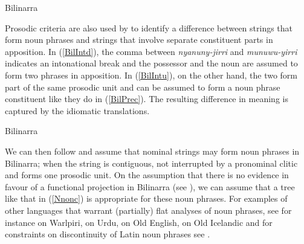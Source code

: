 \documentclass[output=paper,hidelinks]{langscibook}
\begin{document}
\eal\label{Biyi} Bilinarra
\zl

Prosodic criteria are also used by \citeauthor{MeakNord14} to identify a difference between strings that form noun phrases and strings that involve separate constituent parts in apposition. In (\ref{BilIntd}), the comma between \emph{nyanuny-jirri} and  \emph{munuwu-yirri} indicates an intonational break and the possessor and the noun are assumed to form two phrases in apposition. In (\ref{BilIntu}), on the other hand, the two form part of the same prosodic unit and can be assumed to form a noun phrase constituent like they do in (\ref{BilPrec}). The resulting difference in meaning is captured by the idiomatic translations.


\eal Bilinarra \citep[103]{MeakNord14}
\zl

We can then follow \citeauthor{MeakNord14} and assume that nominal strings may form noun phrases in Bilinarra; when the string is contiguous, not interrupted by a pronominal clitic and forms one prosodic unit. On the assumption that there is no evidence in favour of a functional projection in Bilinarra (see ), we can assume that a tree like that in (\ref{Nnonc}) is appropriate for these noun phrases. For examples of other languages that warrant (partially) flat analyses of noun phrases, see for instance \citet{Simpson1991} on Warlpiri, \citet{RazaAhme11} on Urdu, \citet{Lowe15} on Old English, \citet{Borjarsetal16} on Old Icelandic and for constraints on discontinuity of Latin noun phrases see \citet{Snijders12}.
\end{document}
